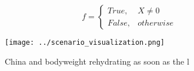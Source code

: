 \documentclass[a4paper]{article}
\begin{document}
\begin{equation}   f =
\begin{cases} True, & X \neq 0\\
False, & otherwise
\end{cases}
\end{equation}

\begin{figure}
\centering
\texttt{[image: ../scenario\_visualization.png]}
\caption{China and bodyweight rehydrating as soon as the l
}
\end{figure}
 
\end{document}
